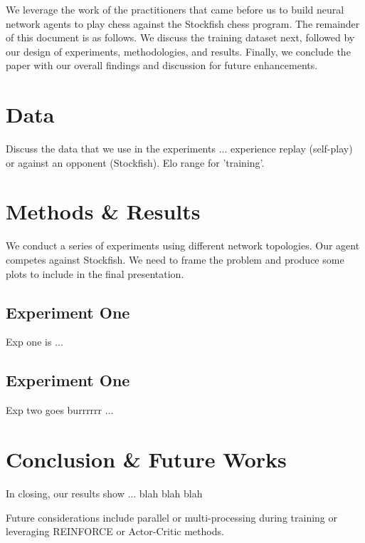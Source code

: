 \documentclass[12pt]{turabian-researchpaper}
\begin{document}
We leverage the work of the practitioners that came before us to build neural network agents to play chess against the Stockfish chess program. The remainder of this document is as follows. We discuss the training dataset next, followed by our design of experiments, methodologies, and results. Finally, we conclude the paper with our overall findings and discussion for future enhancements. 

\section{Data}

Discuss the data that we use in the experiments ... experience replay (self-play) or against an opponent (Stockfish). Elo range for 'training'.


\section{Methods \& Results}

We conduct a series of experiments using different network topologies. Our agent competes against Stockfish. We need to frame the problem and produce some plots to include in the final presentation.  

\subsection{Experiment One}

Exp one is ...

\subsection{Experiment One}

Exp two goes burrrrrr ...

\section{Conclusion \& Future Works}

In closing, our results show ... blah blah blah

Future considerations include parallel or multi-processing during training or leveraging REINFORCE or Actor-Critic methods.

\clearpage
\printbibliography[title={References}]
\end{document}
